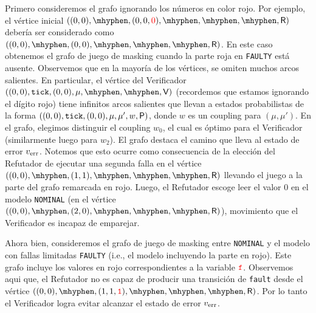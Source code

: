   \noindent%
  Primero consideremos el grafo ignorando los números en color rojo. Por ejemplo, el vértice inicial 
  $\left((0,0),\mhyphen,(0,0,\textcolor{red}{0}),\mhyphen,\mhyphen,\mhyphen,\Refuter\right)$
  debería ser considerado como
  $\left((0,0),\mhyphen,(0,0),\mhyphen,\mhyphen,\mhyphen,\Refuter\right)$.
  En este caso obtenemos el grafo de juego de masking cuando la parte roja en
  \texttt{FAULTY} está ausente.
  Observemos que en la mayoría de los vértices, se omiten muchos arcos salientes. En particular, el vértice del Verificador $\left((0,0),\texttt{tick},(0,0),\mu,\mhyphen,\mhyphen,\Verifier\right)$
  (recordemos que estamos ignorando el dígito rojo) tiene infinitos arcos salientes que llevan a estados probabilistas de la forma
  $\left((0,0),\texttt{tick},(0,0),\mu,\mu',w,\mathsf{P}\right)$,
  donde $w$ es un coupling para $(\mu,\mu')$.
  En el grafo, elegimos distinguir el coupling $w_0$, el cual es óptimo para el Verificador (similarmente luego para $w_2$).
  El grafo destaca el camino que lleva al estado de error $v_{\text{err}}$.
  Notemos que esto ocurre como consecuencia de la elección del Refutador de ejecutar una segunda falla en el vértice
  $\left((0,0),\mhyphen,(1,1),\mhyphen,\mhyphen,\mhyphen,\Refuter\right)$
  llevando el juego a la parte del grafo remarcada en rojo.  Luego, el Refutador escoge leer el valor 0 en el modelo \texttt{NOMINAL}  (en el vértice
  $\left((0,0),\mhyphen,(2,0),\mhyphen,\mhyphen,\mhyphen,\Refuter\right)$),
  movimiento que el Verificador es incapaz de emparejar.
  

  Ahora bien, consideremos el grafo de juego de masking entre \texttt{NOMINAL} y
  el modelo con fallas limitadas \texttt{FAULTY} (i.e., el modelo incluyendo la parte en rojo).  Este grafo incluye los valores en rojo correspondientes a la variable $\textcolor{red}{\texttt{f}}$.  Observemos aqui que, el Refutador no es capaz de producir una transición de \texttt{fault} desde el vértice
  $\left((0,0),\mhyphen,(1,1,\textcolor{red}{\texttt{1}}),\mhyphen,\mhyphen,\mhyphen,\Refuter\right)$.
  Por lo tanto el Verificador logra evitar alcanzar el estado de error
  $v_{\text{err}}$.
\medskip\par



